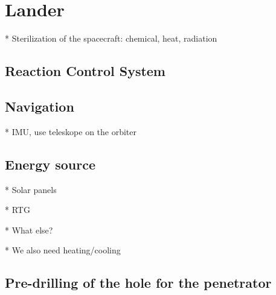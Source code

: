 \chapter{Lander}

* Sterilization of the spacecraft: chemical, heat, radiation




\section{Reaction Control System}

\section{Navigation}

* IMU, use teleskope on the orbiter

\section{Energy source}

* Solar panels

* RTG

* What else?

* We also need heating/cooling

\section{Pre-drilling of the hole for the penetrator}


